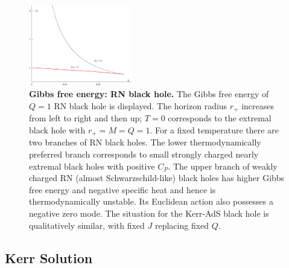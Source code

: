 \begin{figure}
\begin{center}
\includegraphics[width=0.4\textwidth,height=0.3\textheight]{Figures/Gkerrflat.eps}
\caption{{\bf Gibbs free energy: RN black hole.}
The Gibbs free energy of $Q=1$ RN black hole is displayed. The horizon radius $r_+$ increases from left to right and then up; 
$T=0$ corresponds to the extremal black hole with $r_+=M=Q=1$.
For a fixed temperature there are two branches of RN black holes. The lower thermodynamically preferred branch corresponds to small strongly charged nearly extremal black holes with positive $C_P$. The upper branch of weakly charged RN (almost Schwarzschild-like) black holes has higher Gibbs free energy and negative specific heat and hence is thermodynamically unstable. 
Its Euclidean action also possesses a negative zero mode. 
The situation for the Kerr-AdS black hole is qualitatively similar, with fixed $J$ replacing fixed $Q$.
}
\label{Fig:RNGQfixed}
\end{center}
\end{figure}


\subsection{Kerr Solution} 

